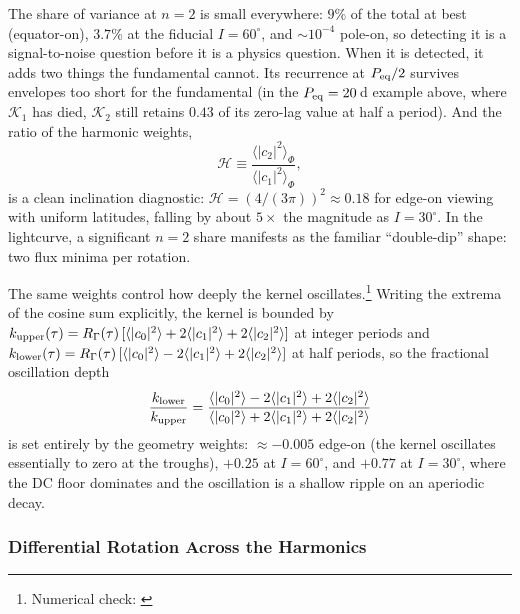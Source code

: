 \documentclass[preprint]{aastex702}
\newcommand\NotebookLink[1]{\href{\GitHubURL/blob/\GitHubSHA/notebooks/#1}{\texttt{\detokenize{#1}}}}
\begin{document}
The share of variance at $n = 2$ is small everywhere: $9\%$ of the total at best (equator-on), $3.7\%$ at the fiducial $I = 60^\circ$, and ${\sim}10^{-4}$ pole-on, so detecting it is a signal-to-noise question before it is a physics question. When it is detected, it adds two things the fundamental cannot. Its recurrence at $P_{\rm eq}/2$ survives envelopes too short for the fundamental (in the $P_{\rm eq} = 20$\,d example above, where $\mathcal{K}_1$ has died, $\mathcal{K}_2$ still retains $0.43$ of its zero-lag value at half a period). And the ratio of the harmonic weights,
\begin{equation}
    \mathcal{H} \equiv \frac{\langle |c_2|^2 \rangle_\Phi}{\langle |c_1|^2 \rangle_\Phi},
    \label{eq:harmonic_ratio}
\end{equation}
is a clean inclination diagnostic: $\mathcal{H} = (4/(3\pi))^2 \approx 0.18$ for edge-on viewing with uniform latitudes, falling by about $5\times$ the magnitude as $I = 30^\circ$. In the lightcurve, a significant $n = 2$ share manifests as the familiar ``double-dip'' shape: two flux minima per rotation.

The same weights control how deeply the kernel oscillates.\footnote{Numerical check: \NotebookLink{lower_envelope_executed.ipynb}} Writing the extrema of the cosine sum explicitly, the kernel is bounded by $k_{\rm upper}(\tau) = R_\Gamma(\tau)\,[\langle|c_0|^2\rangle + 2\langle|c_1|^2\rangle + 2\langle|c_2|^2\rangle]$ at integer periods and $k_{\rm lower}(\tau) = R_\Gamma(\tau)\,[\langle|c_0|^2\rangle - 2\langle|c_1|^2\rangle + 2\langle|c_2|^2\rangle]$ at half periods, so the fractional oscillation depth
\begin{equation}
    \frac{k_{\rm lower}}{k_{\rm upper}} = \frac{\langle|c_0|^2\rangle - 2\langle|c_1|^2\rangle + 2\langle|c_2|^2\rangle}{\langle|c_0|^2\rangle + 2\langle|c_1|^2\rangle + 2\langle|c_2|^2\rangle}
    \label{eq:envelope_ratio}
\end{equation}
is set entirely by the geometry weights: ${\approx}-0.005$ edge-on (the kernel oscillates essentially to zero at the troughs), $+0.25$ at $I = 60^\circ$, and $+0.77$ at $I = 30^\circ$, where the DC floor dominates and the oscillation is a shallow ripple on an aperiodic decay.

\subsubsection{Differential Rotation Across the Harmonics} \label{subsec:harmonic_kappa}
\end{document}

